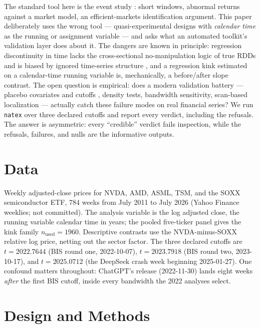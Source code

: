 \documentclass[11pt]{article}
\newcommand{\natex}{\texttt{natex}}
\begin{document}
The standard tool here is the event study \cite{mackinlay1997}: short
windows, abnormal returns against a market model, an efficient-markets
identification argument. This paper deliberately uses the wrong tool ---
quasi-experimental designs with \emph{calendar time} as the running or
assignment variable --- and asks what an automated toolkit's validation layer
does about it. The dangers are known in principle: regression discontinuity
in time lacks the cross-sectional no-manipulation logic of true RDDs and is
biased by ignored time-series structure \cite{hausman2018}, and a regression
kink \cite{card2015,bockerman2025} estimated on a calendar-time running
variable is, mechanically, a before/after slope contrast. The open question
is empirical: does a modern validation battery --- placebo covariates and
cutoffs \cite{ganong2018}, density tests, bandwidth sensitivity, scan-based
localization \cite{herlands2018} --- actually catch these failure modes on
real financial series? We run \natex{} \cite{natex} over three declared
cutoffs and report every verdict, including the refusals. The answer is
asymmetric: every ``credible'' verdict fails inspection, while the refusals,
failures, and nulls are the informative outputs.

\section{Data}\label{sec:data}

Weekly adjusted-close prices for NVDA, AMD, ASML, TSM, and the SOXX
semiconductor ETF, 784 weeks from July 2011 to July 2026 (Yahoo Finance
weeklies; not committed). The analysis variable is the log adjusted close,
the running variable calendar time in years; the pooled five-ticker panel
gives the kink family $n_{\mathrm{used}} = 1960$. Descriptive contrasts use
the NVDA-minus-SOXX relative log price, netting out the sector factor. The three declared cutoffs are
$t = 2022.7644$ (BIS round one, 2022-10-07), $t = 2023.7918$ (BIS round two,
2023-10-17), and $t = 2025.0712$ (the DeepSeek crash week beginning
2025-01-27). One confound matters throughout: ChatGPT's release (2022-11-30)
lands eight weeks \emph{after} the first BIS cutoff, inside every bandwidth
the 2022 analyses select.

\section{Design and Methods}\label{sec:methods}
\end{document}
